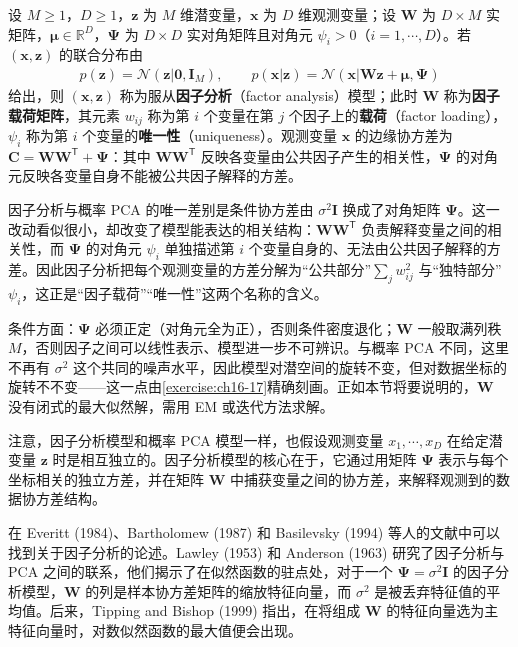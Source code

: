 \documentclass[../../main.tex]{subfiles}
\begin{document}
\begin{definition}[因子分析模型]\label{definition:ch16-因子分析}
设 $M\geqslant1$，$D\geqslant1$，$\bm{z}$ 为 $M$ 维潜变量，$\bm{x}$ 为 $D$ 维观测变量；设 $\bm{W}$ 为 $D\times M$ 实矩阵，$\bm{\mu}\in\mathbb{R}^{D}$，$\bm{\Psi}$ 为 $D\times D$ 实对角矩阵且对角元 $\psi_i>0$（$i=1,\cdots,D$）。若 $(\bm{x},\bm{z})$ 的联合分布由
\begin{align*}
  p(\bm{z})=\mathcal{N}(\bm{z}|\bm{0},\bm{I}_M),\qquad
  p(\bm{x}|\bm{z})=\mathcal{N}(\bm{x}|\bm{W}\bm{z}+\bm{\mu},\bm{\Psi})
\end{align*}
给出，则 $(\bm{x},\bm{z})$ 称为服从\textbf{因子分析}（factor analysis）模型；此时 $\bm{W}$ 称为\textbf{因子载荷矩阵}，其元素 $w_{ij}$ 称为第 $i$ 个变量在第 $j$ 个因子上的\textbf{载荷}（factor loading），$\psi_i$ 称为第 $i$ 个变量的\textbf{唯一性}（uniqueness）。观测变量 $\bm{x}$ 的边缘协方差为 $\bm{C}=\bm{W}\bm{W}^{\mathsf T}+\bm{\Psi}$：其中 $\bm{W}\bm{W}^{\mathsf T}$ 反映各变量由公共因子产生的相关性，$\bm{\Psi}$ 的对角元反映各变量自身不能被公共因子解释的方差。
\end{definition}

\begin{remark}
因子分析与概率 PCA 的唯一差别是条件协方差由 $\sigma^2\bm{I}$ 换成了对角矩阵 $\bm{\Psi}$。这一改动看似很小，却改变了模型能表达的相关结构：$\bm{W}\bm{W}^{\mathsf T}$ 负责解释变量之间的相关性，而 $\bm{\Psi}$ 的对角元 $\psi_i$ 单独描述第 $i$ 个变量自身的、无法由公共因子解释的方差。因此因子分析把每个观测变量的方差分解为“公共部分”$\sum_{j}w_{ij}^2$ 与“独特部分”$\psi_i$，这正是“因子载荷”“唯一性”这两个名称的含义。

条件方面：$\bm{\Psi}$ 必须正定（对角元全为正），否则条件密度退化；$\bm{W}$ 一般取满列秩 $M$，否则因子之间可以线性表示、模型进一步不可辨识。与概率 PCA 不同，这里不再有 $\sigma^2$ 这个共同的噪声水平，因此模型对潜空间的旋转不变，但对数据坐标的旋转不不变——这一点由\cref{exercise:ch16-17}精确刻画。正如本节将要说明的，$\bm{W}$ 没有闭式的最大似然解，需用 EM 或迭代方法求解。
\end{remark}

注意，因子分析模型和概率 PCA 模型一样，也假设观测变量 $x_1,\cdots,x_D$ 在给定潜变量 $\bm{z}$ 时是相互独立的。因子分析模型的核心在于，它通过用矩阵 $\bm{\Psi}$ 表示与每个坐标相关的独立方差，并在矩阵 $\bm{W}$ 中捕获变量之间的协方差，来解释观测到的数据协方差结构。

在 Everitt (1984)、Bartholomew (1987) 和 Basilevsky (1994) 等人的文献中可以找到关于因子分析的论述。Lawley (1953) 和 Anderson (1963) 研究了因子分析与 PCA 之间的联系，他们揭示了在似然函数的驻点处，对于一个 $\bm{\Psi}=\sigma^2\bm{I}$ 的因子分析模型，$\bm{W}$ 的列是样本协方差矩阵的缩放特征向量，而 $\sigma^2$ 是被丢弃特征值的平均值。后来，Tipping and Bishop (1999) 指出，在将组成 $\bm{W}$ 的特征向量选为主特征向量时，对数似然函数的最大值便会出现。
\end{document}
